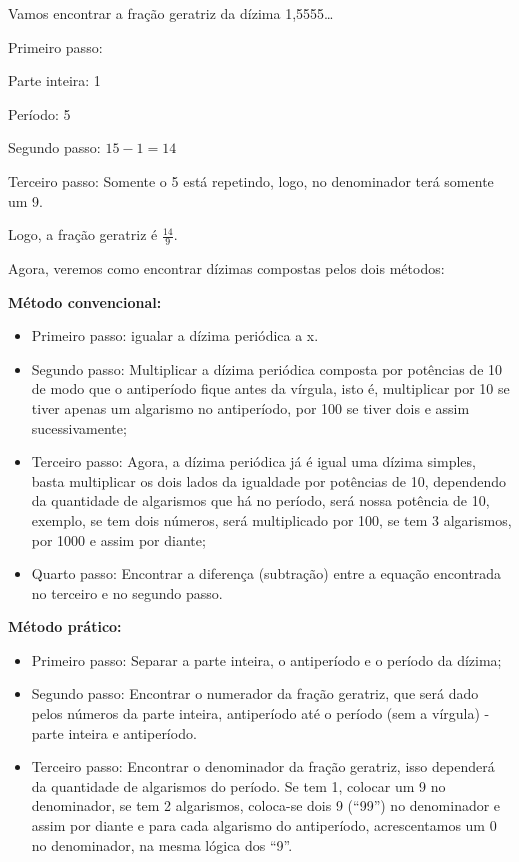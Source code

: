 {{{Vamos encontrar a fração geratriz da dízima 1,5555\ldots{}

Primeiro passo:

Parte inteira: 1

Período: 5

Segundo passo: \(15 - 1 = 14\)

Terceiro passo: Somente o 5 está repetindo, logo, no denominador terá
somente um 9.

Logo, a fração geratriz é \(\frac{14}{9}\).

Agora, veremos como encontrar dízimas compostas pelos dois métodos:

\textbf{Método convencional:}

\begin{itemize}
\item
  Primeiro passo: igualar a dízima periódica a x.
\item
  Segundo passo: Multiplicar a dízima periódica composta por potências
  de 10 de modo que o antiperíodo fique antes da vírgula, isto é,
  multiplicar por 10 se tiver apenas um algarismo no antiperíodo, por
  100 se tiver dois e assim sucessivamente;
\item
  Terceiro passo: Agora, a dízima periódica já é igual uma dízima
  simples, basta multiplicar os dois lados da igualdade por potências de
  10, dependendo da quantidade de algarismos que há no período, será
  nossa potência de 10, exemplo, se tem dois números, será multiplicado
  por 100, se tem 3 algarismos, por 1000 e assim por diante;
\item
  Quarto passo: Encontrar a diferença (subtração) entre a equação
  encontrada no terceiro e no segundo passo.
\end{itemize}

\textbf{Método prático:}

\begin{itemize}
\item
  Primeiro passo: Separar a parte inteira, o antiperíodo e o período da
  dízima;
\item
  Segundo passo: Encontrar o numerador da fração geratriz, que será dado
  pelos números da parte inteira, antiperíodo até o período (sem a
  vírgula) - parte inteira e antiperíodo.
\item
  Terceiro passo: Encontrar o denominador da fração geratriz, isso
  dependerá da quantidade de algarismos do período. Se tem 1, colocar um
  9 no denominador, se tem 2 algarismos, coloca-se dois 9 (``99'') no
  denominador e assim por diante e para cada algarismo do antiperíodo,
  acrescentamos um 0 no denominador, na mesma lógica dos ``9''.
\end{itemize}

}}}
